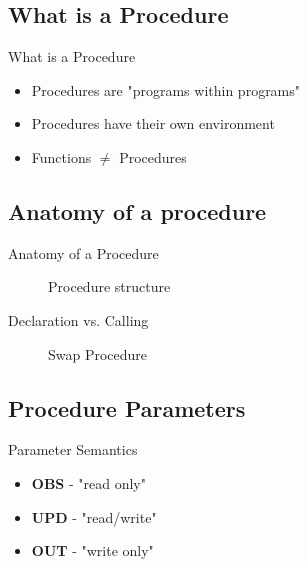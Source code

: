 
\subsection*{What is a Procedure}
\begin{frame}{What is a Procedure}
    \begin{itemize}
        \item Procedures are "programs within programs"
        \item Procedures have their own environment
        \item Functions $\neq$ Procedures
    \end{itemize}
\end{frame}

\subsection*{Anatomy of a procedure}
\begin{frame}{Anatomy of a Procedure}
    \begin{figure}
        
        \label{fig:anatomy}
        \caption{Procedure structure}
    \end{figure}
\end{frame}


\begin{frame}{Declaration vs. Calling}
    \begin{figure}
        
        \label{fig:ex1}
        \caption{Swap Procedure}
    \end{figure}
\end{frame}

\subsection*{Procedure Parameters}
\begin{frame}{Parameter Semantics}
    \begin{itemize}
        \item \textbf{OBS} - "read only"
        \item \textbf{UPD} - "read/write"
        \item \textbf{OUT} - "write only"
    \end{itemize}
\end{frame}

